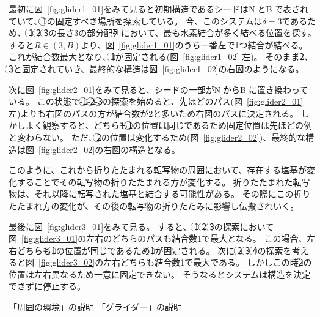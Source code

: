 \documentclass[a4,11pt]{article}
\begin{document}
最初に図~\ref{fig:glider1_01}をみて見ると初期構造であるシードは\textcircled{\scriptsize N}と\textcircled{\scriptsize B}で表されていて、\textcircled{\scriptsize 1}の固定すべき場所を探索している。
今、このシステムは$\delta =3$であるため、{-}\textcircled{\scriptsize 1}{-}\textcircled{\scriptsize 2}{-}\textcircled{\scriptsize 3}の長さ3の部分配列において、最も水素結合が多く結べる位置を探す。
すると$R \in (3,B)$より、図~\ref{fig:glider1_01}のうち一番左で1つ結合が結べる。
これが結合数最大となり、\textcircled{\scriptsize 1}が固定される(図~\ref{fig:glider1_02} 左)。
そのまま\textcircled{\scriptsize 2}、\textcircled{\scriptsize 3}と固定されていき、最終的な構造は図~\ref{fig:glider1_02}の右図のようになる。

次に図~\ref{fig:glider2_01}をみて見ると、シードの一部が\textcircled{\scriptsize N}から\textcircled{\scriptsize B}に置き換わっている。
この状態で{-}\textcircled{\scriptsize 1}{-}\textcircled{\scriptsize 2}{-}\textcircled{\scriptsize 3}の探索を始めると、先ほどのパス(図~\ref{fig:glider2_01} 左)よりも右図のパスの方が結合数が2と多いため右図のパスに決定される。
しかしよく観察すると、どちらも\textcircled{\scriptsize 1}の位置は同じであるため固定位置は先ほどの例と変わらない。
ただ、\textcircled{\scriptsize 2}の位置は変化するため(図~\ref{fig:glider2_02})、最終的な構造は図~\ref{fig:glider2_02}の右図の構造となる。

このように、これから折りたたまれる転写物の周囲において、存在する塩基が変化することでその転写物の折りたたまれる方が変化する。
折りたたまれた転写物は、それ以降に転写された塩基と結合する可能性がある。
その際にこの折りたたまれ方の変化が、その後の転写物の折りたたみに影響し伝搬されいく。

最後に図~\ref{fig:glider3_01}をみて見る。
すると、{-}\textcircled{\scriptsize 1}{-}\textcircled{\scriptsize 2}{-}\textcircled{\scriptsize 3}の探索において図~\ref{fig:glider3_01}の左右のどちらのパスも結合数1で最大となる。
この場合、左右どちらも\textcircled{\scriptsize 1}の位置が同じであるため\textcircled{\scriptsize 1}が固定される。
次に{-}\textcircled{\scriptsize 2}{-}\textcircled{\scriptsize 3}{-}\textcircled{\scriptsize 4}の探索を考えると図~\ref{fig:glider3_02}の左右どちらも結合数1で最大である。
しかしこの時\textcircled{\scriptsize 2}の位置は左右異なるため一意に固定できない。
そうなるとシステムは構造を決定できずに停止する。





「周囲の環境」の説明
「グライダー」の説明

\end{document}
